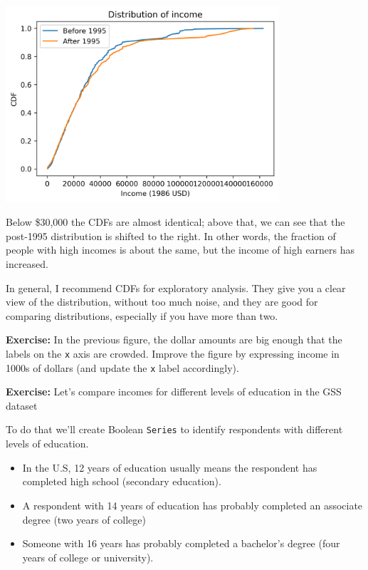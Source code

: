 \begin{center}
\includegraphics[width=4in]{chapters/08_distributions_files/08_distributions_101_0.png}
\end{center}

Below \$30,000 the CDFs are almost identical; above that, we can see
that the post-1995 distribution is shifted to the right. In other words,
the fraction of people with high incomes is about the same, but the
income of high earners has increased.

In general, I recommend CDFs for exploratory analysis. They give you a
clear view of the distribution, without too much noise, and they are
good for comparing distributions, especially if you have more than two.

\textbf{Exercise:} In the previous figure, the dollar amounts are big
enough that the labels on the \passthrough{\lstinline!x!} axis are
crowded. Improve the figure by expressing income in 1000s of dollars
(and update the \passthrough{\lstinline!x!} label accordingly).

\textbf{Exercise:} Let's compare incomes for different levels of
education in the GSS dataset

To do that we'll create Boolean \passthrough{\lstinline!Series!} to
identify respondents with different levels of education.

\begin{itemize}
\item
  In the U.S, 12 years of education usually means the respondent has
  completed high school (secondary education).
\item
  A respondent with 14 years of education has probably completed an
  associate degree (two years of college)
\item
  Someone with 16 years has probably completed a bachelor's degree (four
  years of college or university).
\end{itemize}

